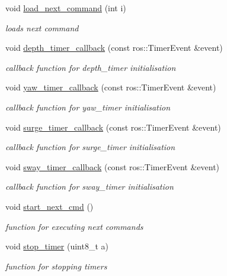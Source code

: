 \begin{DoxyCompactItemize}
void \hyperlink{classControl_a8feeefb41dd3d3e460b2719444a6a309}{load\+\_\+next\+\_\+command} (int i)
\begin{DoxyCompactList}\small\item\em loads next command \end{DoxyCompactList}\item 
void \hyperlink{classControl_a7220c85e82072fc36ce786e16ff04e51}{depth\+\_\+timer\+\_\+callback} (const ros\+::\+Timer\+Event \&event)
\begin{DoxyCompactList}\small\item\em callback function for depth\+\_\+timer initialisation \end{DoxyCompactList}\item 
void \hyperlink{classControl_a2a3be58334e32c711f454545c18ee309}{yaw\+\_\+timer\+\_\+callback} (const ros\+::\+Timer\+Event \&event)
\begin{DoxyCompactList}\small\item\em callback function for yaw\+\_\+timer initialisation \end{DoxyCompactList}\item 
void \hyperlink{classControl_aac079e9acf0dfcb3a587410ca13360f8}{surge\+\_\+timer\+\_\+callback} (const ros\+::\+Timer\+Event \&event)
\begin{DoxyCompactList}\small\item\em callback function for surge\+\_\+timer initialisation \end{DoxyCompactList}\item 
void \hyperlink{classControl_a8e578602a9fec51a4d86b4e0cb89653f}{sway\+\_\+timer\+\_\+callback} (const ros\+::\+Timer\+Event \&event)
\begin{DoxyCompactList}\small\item\em callback function for sway\+\_\+timer initialisation \end{DoxyCompactList}\item 
void \hyperlink{classControl_a7618be791732b449b3bcc25c2397b7d2}{start\+\_\+next\+\_\+cmd} ()
\begin{DoxyCompactList}\small\item\em function for executing next commands \end{DoxyCompactList}\item 
void \hyperlink{classControl_ac1f9d1bd071865ab7b189ae2885b1e26}{stop\+\_\+timer} (uint8\+\_\+t a)
\begin{DoxyCompactList}\small\item\em function for stopping timers \end{DoxyCompactList}\item 

\end{DoxyCompactItemize}

